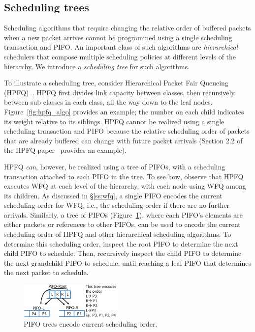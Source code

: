 \subsection{Scheduling trees}
\label{ss:hpfq}

Scheduling algorithms that require changing the relative order of
buffered packets when a new packet arrives cannot be programmed using
a single scheduling transaction and PIFO. An important class of such
algorithms are {\em hierarchical} schedulers that compose multiple
scheduling policies at different levels of the hierarchy. We introduce
a {\em scheduling tree} for such algorithms.

To illustrate a scheduling tree, consider Hierarchical Packet Fair
Queueing (HPFQ)~\cite{hpfq}. HPFQ first divides link capacity between
classes, then recursively between sub classes in each class, all the
way down to the leaf nodes.  Figure~\ref{fig:hpfq_algo} provides an
example; the number on each child indicates its weight relative to its
siblings.  HPFQ cannot be realized using a single scheduling
transaction and PIFO because the relative scheduling order of packets
that are already buffered can change with future packet arrivals
(Section 2.2 of the HPFQ paper~\cite{hpfq} provides an example).


HPFQ {\em can}, however, be realized using a tree of PIFOs, with a
scheduling transaction attached to each PIFO in the tree. To see how,
observe that HPFQ executes WFQ at each level of the hierarchy, with
each node using WFQ among its children. As discussed in
\S\ref{ss:wfq}, a single PIFO encodes the current scheduling order for
WFQ, i.e., the scheduling order if there are no further
arrivals. Similarly, a tree of PIFOs (Figure~\ref{fig:pifo_encoding}),
where each PIFO's elements are either packets or references to other
PIFOs, can be used to encode the current scheduling order of HPFQ and
other hierarchical scheduling algorithms. To determine this scheduling
order, inspect the root PIFO to determine the next child PIFO to
schedule. Then, recursively inspect the child PIFO to determine the
next grandchild PIFO to schedule, until reaching a leaf PIFO that
determines the next packet to schedule.

\begin{figure}
\centering
\includegraphics[width=0.45\textwidth]{pifo_pifo_tree_encoding.pdf}
\caption{PIFO trees encode current scheduling order.}
\label{fig:pifo_encoding}
\end{figure}


